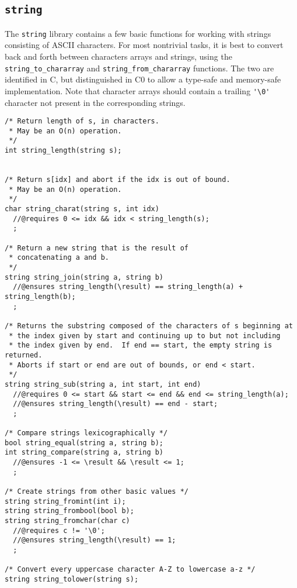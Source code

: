 \documentclass[11pt]{article}
\begin{document}
\clearpage
\subsection{\tt string}

The \verb'string' library contains a few basic functions for working
with strings consisting of ASCII characters.  For most nontrivial
tasks, it is best to convert back and forth between characters arrays
and strings, using the \verb'string_to_chararray' and
\verb'string_from_chararray' functions.  The two are identified in C,
but distinguished in C0 to allow a type-safe and memory-safe
implementation.  Note that character arrays should contain a trailing
\verb"'\0'" character not present in the corresponding strings.

\begin{small}
\begin{verbatim}
/* Return length of s, in characters.
 * May be an O(n) operation.
 */
int string_length(string s);  
         

/* Return s[idx] and abort if the idx is out of bound.
 * May be an O(n) operation.
 */
char string_charat(string s, int idx)
  //@requires 0 <= idx && idx < string_length(s);
  ;

/* Return a new string that is the result of
 * concatenating a and b.
 */
string string_join(string a, string b)
  //@ensures string_length(\result) == string_length(a) + string_length(b);
  ;

/* Returns the substring composed of the characters of s beginning at
 * the index given by start and continuing up to but not including
 * the index given by end.  If end == start, the empty string is returned.
 * Aborts if start or end are out of bounds, or end < start.
 */
string string_sub(string a, int start, int end)
  //@requires 0 <= start && start <= end && end <= string_length(a);
  //@ensures string_length(\result) == end - start;
  ;

/* Compare strings lexicographically */
bool string_equal(string a, string b);
int string_compare(string a, string b)
  //@ensures -1 <= \result && \result <= 1;
  ;

/* Create strings from other basic values */
string string_fromint(int i);
string string_frombool(bool b);
string string_fromchar(char c)
  //@requires c != '\0';
  //@ensures string_length(\result) == 1;
  ;

/* Convert every uppercase character A-Z to lowercase a-z */
string string_tolower(string s);


\end{verbatim}
\end{small}
\end{document}
